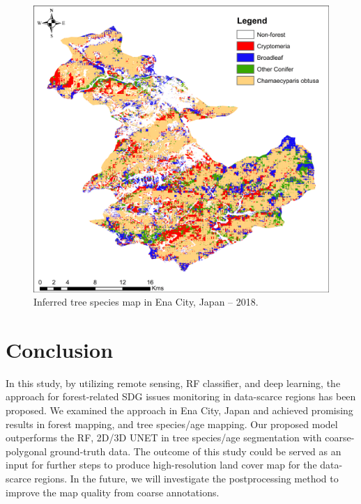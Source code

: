 \begin{figure}[tbh!]
    \centering
    \includegraphics[width=\textwidth]{figs/chap5/spec_map.png}
    \caption[Inferred tree species map in Ena City]{Inferred tree species map in Ena City, Japan – 2018.}
    \label{fig:chap5_fig7}
\end{figure}

\section{Conclusion} \label{chap5_conclusion}
In this study, by utilizing remote sensing, RF classifier, and deep learning, the approach for forest-related SDG issues monitoring in data-scarce regions has been proposed. We examined the approach in Ena City, Japan and achieved promising results in forest mapping, and tree species/age mapping. Our proposed model outperforms the RF, 2D/3D UNET in tree species/age segmentation with coarse-polygonal ground-truth data. The outcome of this study could be served as an input for further steps to produce high-resolution land cover map for the data-scarce regions. In the future, we will investigate the postprocessing method to improve the map quality from coarse annotations.